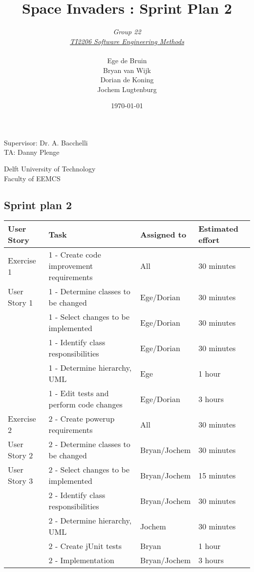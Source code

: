 \documentclass[10pt]{article}
\begin{document}
\title{Space Invaders : Sprint Plan 2}
\date{\today}
\author{\textit{Group 22}\\ \textit{\underline{TI2206 Software Engineering Methods}} \\
 \\Ege de Bruin \\ Bryan van Wijk \\ Dorian de Koning \\ Jochem Lugtenburg }
 \maketitle  
 \begin{center}
Supervisor: Dr. A. Bacchelli\\
TA: Danny Plenge\\
 \end{center}     
 \begin{center}
 Delft University of Technology\\
 Faculty of EEMCS\\
 \end{center}
 \thispagestyle{empty}
 \pagebreak
 
\begin{center}

\section*{Sprint plan 2}

    \begin{tabular}{ | p{2cm} | p{9cm} | p{2.1cm} | p{2cm} |}
    \hline
    User Story & Task & Assigned to & Estimated effort \\ \hline
    Exercise 1 & 1 - Create code improvement requirements & All & 30 minutes \\ 
    User Story 1 & 1 - Determine classes to be changed & Ege/Dorian & 30 minutes \\ 
    & 1 - Select changes to be implemented & Ege/Dorian & 30 minutes \\ 
    & 1 - Identify class responsibilities & Ege/Dorian & 30 minutes \\ 
    & 1 - Determine hierarchy, UML & Ege & 1 hour \\ 
    & 1 - Edit tests and perform code changes & Ege/Dorian & 3 hours \\ \hline
    Exercise 2 & 2 - Create powerup requirements & All & 30 minutes \\ 
    User Story 2 & 2 - Determine classes to be changed & Bryan/Jochem & 30 minutes \\ 
    User Story 3 & 2 - Select changes to be implemented & Bryan/Jochem & 15 minutes \\ 
    & 2 - Identify class responsibilities & Bryan/Jochem & 30 minutes \\ 
    & 2 - Determine hierarchy, UML & Jochem & 30 minutes \\ 
    & 2 - Create jUnit tests & Bryan & 1 hour \\ 
    & 2 - Implementation & Bryan/Jochem & 3 hours \\ \hline    
    \end{tabular}
    
\end{center}
\end{document}
